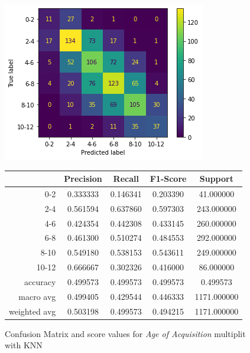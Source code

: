 \documentclass[a4paper,11pt,dvipsnames]{article}
\begin{document}
\begin{figure}[h]
  \begin{minipage}{.4\linewidth}
    \centering
    \includegraphics[width=\textwidth]{aoa_multi_confusion_matrix.png}%
  \end{minipage}
  \begin{minipage}{.2\linewidth}
    \centering
\begin{tabular}{|r|c|c|c|c|}
\toprule
{} &  Precision &    Recall &  F1-Score &      Support \\
\midrule\midrule
0-2          &   0.333333 &  0.146341 &  0.203390 &    41.000000 \\
2-4          &   0.561594 &  0.637860 &  0.597303 &   243.000000 \\
4-6          &   0.424354 &  0.442308 &  0.433145 &   260.000000 \\
6-8          &   0.461300 &  0.510274 &  0.484553 &   292.000000 \\
8-10          &   0.549180 &  0.538153 &  0.543611 &   249.000000 \\
10-12          &   0.666667 &  0.302326 &  0.416000 &    86.000000 \\
accuracy     &   0.499573 &  0.499573 &  0.499573 &     0.499573 \\
macro avg    &   0.499405 &  0.429544 &  0.446333 &  1171.000000 \\
weighted avg &   0.503198 &  0.499573 &  0.494215 &  1171.000000 \\
\bottomrule
\end{tabular}

  \end{minipage}
  
  \caption{Confusion Matrix and score values for \textit{Age of Acquisition} multiplit with KNN} \label{aoa_multi_KNN}
\end{figure}
\end{document}
